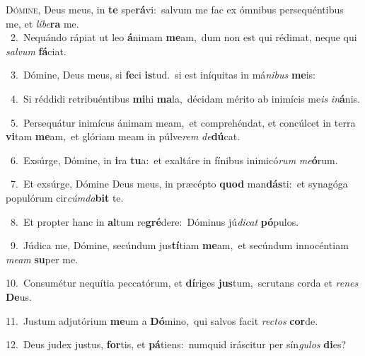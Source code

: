 \lettrine{\initial\textcolor{\initialcolor}{D}}{ómine,} Deus meus, in \textbf{te} spe\-\textbf{rá}\-vi:~\star salvum me fac ex ómnibus persequéntibus me, et \textit{lí}\-\textit{be}\textbf{ra} me.\\
{\numbfont\textcolor{\numbcolor}{~2.}}~Nequándo rápiat ut leo \textbf{á}\-nimam \textbf{me}\-am,~\star dum non est qui rédimat, neque qui \textit{sal}\-\textit{vum} \textbf{fá}\-ciat.\par
{\numbfont\textcolor{\numbcolor}{~3.}}~Dómine, Deus meus, si \textbf{fe}\-ci \textbf{is}\-tud.~\star si est iníquitas in má\-\textit{ni}\-\textit{bus} \textbf{me}\-is:\par
{\numbfont\textcolor{\numbcolor}{~4.}}~Si réddidi retribuéntibus \textbf{mi}\-hi \textbf{ma}\-la,~\star décidam mérito ab inimícis me\textit{is} \textit{in}\-\textbf{á}nis.\par
{\numbfont\textcolor{\numbcolor}{~5.}}~Persequátur inimícus ánimam meam,~\dagger et comprehéndat, et concúlcet in terra \textbf{vi}\-tam \textbf{me}\-am,~\star et glóriam meam in púlve\textit{rem} \textit{de}\-\textbf{dú}cat.\par
{\numbfont\textcolor{\numbcolor}{~6.}}~Exsúrge, Dómine, in \textbf{i}\-ra \textbf{tu}\-a:~\star et exaltáre in fínibus inimicó\textit{rum} \textit{me}\-\textbf{ó}rum.\par
{\numbfont\textcolor{\numbcolor}{~7.}}~Et exsúrge, Dómine Deus meus, in præcépto \textbf{quod} man\-\textbf{dás}\-ti:~\star et synagóga populórum cir\-\textit{cúm}\-\textit{da}\textbf{bit} te.\par
{\numbfont\textcolor{\numbcolor}{~8.}}~Et propter hanc in \textbf{al}\-tum re\-\textbf{gré}\-dere:~\star Dóminus jú\-\textit{di}\-\textit{cat} \textbf{pó}\-pulos.\par
{\numbfont\textcolor{\numbcolor}{~9.}}~Júdica me, Dómine, secúndum jus\-\textbf{tí}\-tiam \textbf{me}\-am,~\star et secúndum innocéntiam \textit{me}\-\textit{am} \textbf{su}\-per me.\par
{\numbfont\textcolor{\numbcolor}{10.}}~Consumétur nequítia peccatórum, et \textbf{dí}\-riges \textbf{jus}\-tum,~\star scrutans corda et \textit{re}\-\textit{nes} \textbf{De}\-us.\par
{\numbfont\textcolor{\numbcolor}{11.}}~Justum adjutórium \textbf{me}\-um a \textbf{Dó}\-mino,~\star qui salvos facit \textit{rec}\-\textit{tos} \textbf{cor}\-de.\par
{\numbfont\textcolor{\numbcolor}{12.}}~Deus judex justus, \textbf{for}\-tis, et \textbf{pá}\-tiens:~\star numquid iráscitur per sín\-\textit{gu}\-\textit{los} \textbf{di}\-es?\par

